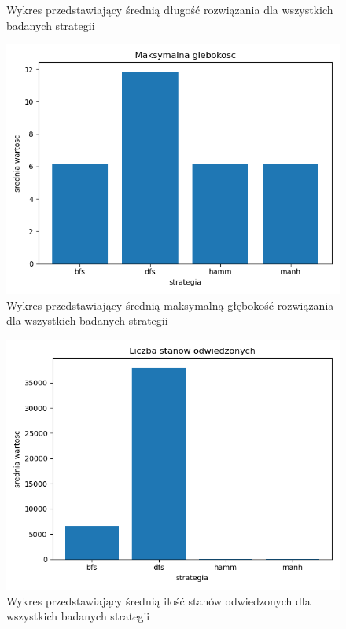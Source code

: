 \documentclass{classrep}
\begin{document}
{\begin{figure}
\caption{Wykres przedstawiający średnią długość rozwiązania dla wszystkich badanych strategii}
\end{figure}
\begin{figure}
\centering
\includegraphics [scale=0.5]{glebokosc}
\caption{Wykres przedstawiający średnią maksymalną głębokość rozwiązania dla wszystkich badanych strategii}
\end{figure}
\begin{figure}
\centering
\includegraphics [scale=0.5]{odwiedzone}
\caption{Wykres przedstawiający średnią ilość stanów odwiedzonych dla wszystkich badanych strategii}
\end{figure}
\begin{figure}
\centering

\end{figure}}
\end{document}
